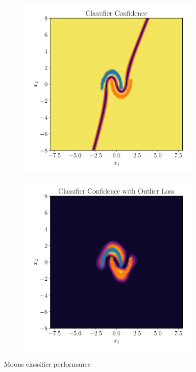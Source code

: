 \begin{figure}[htpb]
\begin{subfigure}[]{0.4\textwidth}
        \caption{}
        \label{fig:}
    \end{subfigure}
    \begin{subfigure}[]{0.4\textwidth}
        \centering
    \includegraphics[width=\linewidth]{figures/toy_example/moons/classifier_confidence.pdf}
        \caption{}
        \label{fig:}
    \end{subfigure}
    \begin{subfigure}[]{0.4\textwidth}
        \centering
    \includegraphics[width=\linewidth]{figures/toy_example/moons/classifier_kl_confidence.pdf}
        \caption{}
        \label{fig:}
    \end{subfigure}
    
    \caption{Moons classifier performance}%
    \label{fig:classifier_moons}
\end{figure}

